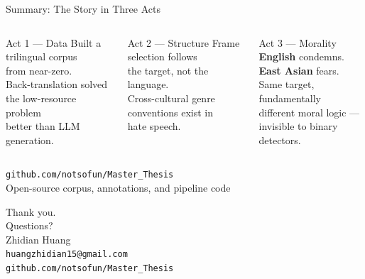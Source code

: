 \documentclass[aspectratio=169,10pt]{beamer}
\begin{document}
\begin{frame}{Summary: The Story in Three Acts}
  \begin{columns}[T]
      \begin{block}{Act 1 --- Data}
        \small
        Built a trilingual corpus\\
        from near-zero.\\[4pt]
        Back-translation solved\\
        the low-resource problem\\
        better than LLM generation.
      \end{block}
      \begin{block}{Act 2 --- Structure}
        \small
        Frame selection follows\\
        the target, not the language.\\[4pt]
        Cross-cultural genre\\
        conventions exist in\\
        hate speech.
      \end{block}
      \begin{alertblock}{Act 3 --- Morality}
        \small
        \textbf{English} condemns.\\
        \textbf{East Asian} fears.\\[4pt]
        Same target, fundamentally\\
        different moral logic ---\\
        invisible to binary detectors.
      \end{alertblock}
  \end{columns}
  \vspace{10pt}
  \begin{center}
    \small\texttt{github.com/notsofun/Master\_Thesis}\\[4pt]
    {\footnotesize\color{darkgray} Open-source corpus, annotations, and pipeline code}
  \end{center}
\end{frame}

\begin{frame}[plain]
  \begin{center}
    \vspace{1.5cm}
    {\Huge\color{uzh} Thank you.}\\[20pt]
    {\Large Questions?}\\[24pt]
    \small
    Zhidian Huang\\
    \texttt{huangzhidian15@gmail.com}\\[8pt]
    \texttt{github.com/notsofun/Master\_Thesis}
  \end{center}
\end{frame}

\end{document}
